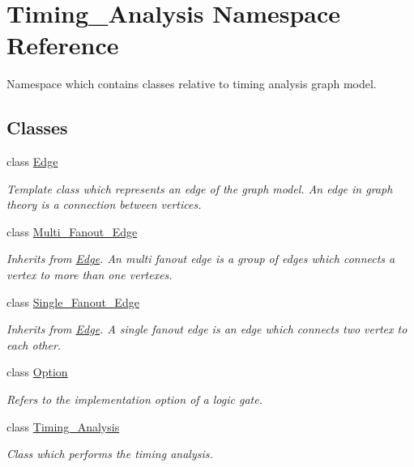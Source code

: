 \hypertarget{namespaceTiming__Analysis}{\section{Timing\-\_\-\-Analysis Namespace Reference}
\label{namespaceTiming__Analysis}
}


Namespace which contains classes relative to timing analysis graph model.  


\subsection*{Classes}
\begin{DoxyCompactItemize}
\item 
class \hyperlink{classTiming__Analysis_1_1Edge}{Edge}
\begin{DoxyCompactList}\small\item\em Template class which represents an edge of the graph model. An edge in graph theory is a connection between vertices. \end{DoxyCompactList}\item 
class \hyperlink{classTiming__Analysis_1_1Multi__Fanout__Edge}{Multi\-\_\-\-Fanout\-\_\-\-Edge}
\begin{DoxyCompactList}\small\item\em Inherits from \hyperlink{classTiming__Analysis_1_1Edge}{Edge}. An multi fanout edge is a group of edges which connects a vertex to more than one vertexes. \end{DoxyCompactList}\item 
class \hyperlink{classTiming__Analysis_1_1Single__Fanout__Edge}{Single\-\_\-\-Fanout\-\_\-\-Edge}
\begin{DoxyCompactList}\small\item\em Inherits from \hyperlink{classTiming__Analysis_1_1Edge}{Edge}. A single fanout edge is an edge which connects two vertex to each other. \end{DoxyCompactList}\item 
class \hyperlink{classTiming__Analysis_1_1Option}{Option}
\begin{DoxyCompactList}\small\item\em Refers to the implementation option of a logic gate. \end{DoxyCompactList}\item 
class \hyperlink{classTiming__Analysis_1_1Timing__Analysis}{Timing\-\_\-\-Analysis}
\begin{DoxyCompactList}\small\item\em Class which performs the timing analysis. \end{DoxyCompactList}\item 

\end{DoxyCompactItemize}
